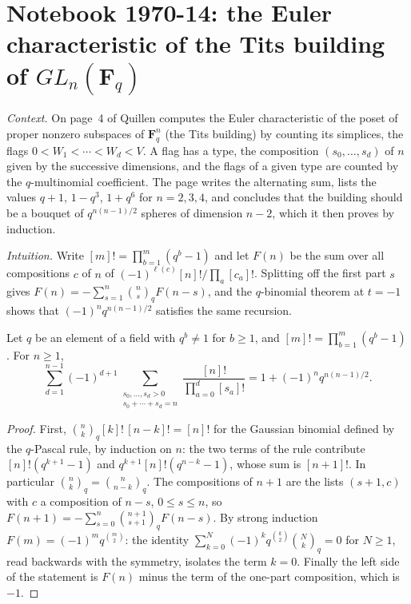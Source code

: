 \section[Notebook 1970-14: the Euler characteristic of the Tits building]{Notebook 1970-14: the Euler characteristic of the Tits building of $GL_n(\mathbf F_q)$\protect{}}\label{sec:quillen-1970-14}

\emph{Context.} On page~4 of  Quillen computes the Euler characteristic of the poset of proper nonzero subspaces of $\mathbf F_q^n$ (the Tits building) by counting its simplices, the flags $0 < W_1 < \cdots < W_d < V$. A flag has a type, the composition $(s_0, \ldots, s_d)$ of $n$ given by the successive dimensions, and the flags of a given type are counted by the $q$-multinomial coefficient. The page writes the alternating sum, lists the values $q + 1$, $1 - q^3$, $1 + q^6$ for $n = 2, 3, 4$, and concludes that the building should be a bouquet of $q^{n(n-1)/2}$ spheres of dimension $n - 2$, which it then proves by induction.

\emph{Intuition.} Write $[m]! = \prod_{b=1}^m (q^b - 1)$ and let $F(n)$ be the sum over all compositions $c$ of $n$ of $(-1)^{\ell(c)}[n]!/\prod_a [c_a]!$. Splitting off the first part $s$ gives $F(n) = -\sum_{s=1}^n \binom{n}{s}_q F(n - s)$, and the $q$-binomial theorem at $t = -1$ shows that $(-1)^n q^{n(n-1)/2}$ satisfies the same recursion.

\begin{encadre}
\begin{theoreme}\label{thm:quillen-1970-14}
Let $q$ be an element of a field with $q^b \ne 1$ for $b \ge 1$, and $[m]! = \prod_{b=1}^m (q^b - 1)$. For $n \ge 1$,
\[
\sum_{d=1}^{n-1} (-1)^{d+1} \sum_{\substack{s_0, \ldots, s_d > 0\\ s_0 + \cdots + s_d = n}} \frac{[n]!}{\prod_{a=0}^d [s_a]!} = 1 + (-1)^n q^{n(n-1)/2}.
\]
\end{theoreme}
\end{encadre}

\begin{proof}
First, $\binom{n}{k}_q [k]!\,[n-k]! = [n]!$ for the Gaussian binomial defined by the $q$-Pascal rule, by induction on $n$: the two terms of the rule contribute $[n]!(q^{k+1} - 1)$ and $q^{k+1}[n]!(q^{n-k} - 1)$, whose sum is $[n+1]!$. In particular $\binom{n}{k}_q = \binom{n}{n-k}_q$. The compositions of $n + 1$ are the lists $(s + 1, c)$ with $c$ a composition of $n - s$, $0 \le s \le n$, so $F(n+1) = -\sum_{s=0}^{n}\binom{n+1}{s+1}_q F(n - s)$. By strong induction $F(m) = (-1)^m q^{\binom m2}$: the identity $\sum_{k=0}^{N}(-1)^k q^{\binom k2}\binom Nk_q = 0$ for $N \ge 1$, read backwards with the symmetry, isolates the term $k = 0$. Finally the left side of the statement is $F(n)$ minus the term of the one-part composition, which is $-1$.
\end{proof}

